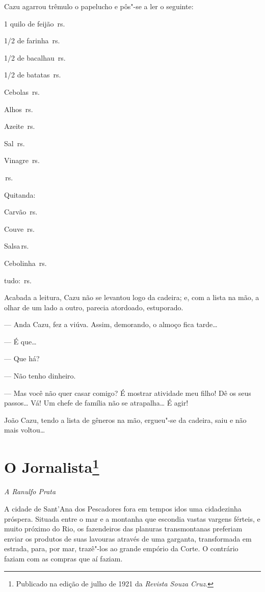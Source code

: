 Cazu agarrou trêmulo o papelucho e pôs"-se a ler o seguinte:

\medskip

1 quilo de feijão \,rs.

1/2 de farinha \,rs.

1/2 de bacalhau \,rs.

1/2 de batatas \,rs.

Cebolas \,rs.

Alhos \,rs.

Azeite \,rs.

Sal \,rs.

Vinagre \,rs.

\,rs.

\smallskip

Quitanda:

Carvão \,rs.

Couve \,rs.

Salsa\,rs.

Cebolinha \,rs.

tudo: \,rs.\medskip

Acabada a leitura, Cazu não se levantou logo da cadeira; e, com a lista
na mão, a olhar de um lado a outro, parecia atordoado, estuporado.

--- Anda Cazu, fez a viúva. Assim, demorando, o almoço fica
tarde\ldots{}

--- É que\ldots{}

--- Que há?

--- Não tenho dinheiro.

--- Mas você não quer casar comigo? É mostrar atividade meu filho! Dê os
seus passos\ldots{} Vá! Um chefe de família não se atrapalha\ldots{} É
agir!

João Cazu, tendo a lista de gêneros na mão, ergueu"-se da cadeira, saiu e
não mais voltou\ldots{}



\chapter[O Jornalista]{O Jornalista\footnote[*]{Publicado na edição de julho de 1921 da \emph{Revista Souza Cruz}.}}

\hfill\emph{A Ranulfo Prata}\bigskip

\noindent{}A cidade de Sant'Ana dos Pescadores fora em tempos idos uma cidadezinha
próspera. Situada entre o mar e a montanha que escondia vastas vargens
férteis, e muito próximo do Rio, os fazendeiros das planuras
transmontanas preferiam enviar os produtos de suas lavouras através de
uma garganta, transformada em estrada, para, por mar, trazê"-los ao
grande empório da Corte. O contrário faziam com as compras que aí
faziam.

